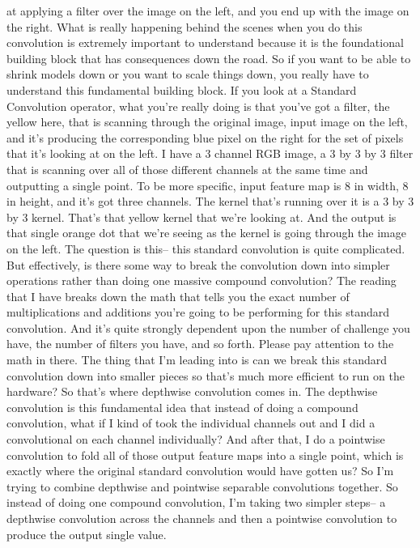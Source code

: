 at applying a filter over the image on the left,
and you end up with the image on the right.
What is really happening behind the scenes
when you do this convolution is extremely important to understand
because it is the foundational building block that has consequences
down the road.
So if you want to be able to shrink models down
or you want to scale things down, you really
have to understand this fundamental building block.
If you look at a Standard Convolution operator, what you're really doing
is that you've got a filter, the yellow here, that
is scanning through the original image, input image on the left,
and it's producing the corresponding blue pixel
on the right for the set of pixels that it's looking at on the left.
I have a 3 channel RGB image, a 3 by 3 by 3 filter
that is scanning over all of those different channels at the same time
and outputting a single point.
To be more specific, input feature map is 8 in width, 8 in height,
and it's got three channels.
The kernel that's running over it is a 3 by 3 by 3 kernel.
That's that yellow kernel that we're looking at.
And the output is that single orange dot that we're
seeing as the kernel is going through the image on the left.
The question is this-- this standard convolution is quite complicated.
But effectively, is there some way to break the convolution down
into simpler operations rather than doing one massive compound convolution?
The reading that I have breaks down the math that tells you
the exact number of multiplications and additions
you're going to be performing for this standard convolution.
And it's quite strongly dependent upon the number of challenge you have,
the number of filters you have, and so forth.
Please pay attention to the math in there.
The thing that I'm leading into is can we break this standard convolution down
into smaller pieces so that's much more efficient to run on the hardware?
So that's where depthwise convolution comes in.
The depthwise convolution is this fundamental idea
that instead of doing a compound convolution,
what if I kind of took the individual channels out
and I did a convolutional on each channel individually?
And after that, I do a pointwise convolution
to fold all of those output feature maps into a single point, which
is exactly where the original standard convolution would have gotten us?
So I'm trying to combine depthwise and pointwise separable convolutions
together.
So instead of doing one compound convolution,
I'm taking two simpler steps--
a depthwise convolution across the channels and then a pointwise
convolution to produce the output single value.
